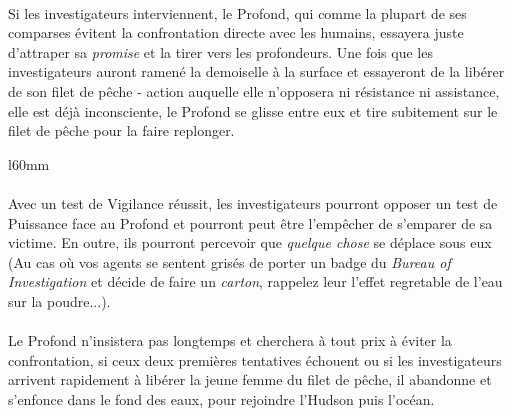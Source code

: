 \paragraph{} Si les investigateurs interviennent, le Profond, qui comme la plupart de ses comparses évitent la confrontation directe avec les humains,
essayera juste d'attraper sa \emph{promise} et la tirer vers les profondeurs. Une fois que les investigateurs auront ramené la demoiselle à la surface
et essayeront de la libérer de son filet de pêche - action auquelle elle n'opposera ni résistance ni assistance, elle est déjà inconsciente, le Profond
se glisse entre eux et tire subitement sur le filet de pêche pour la faire replonger.

\begin{wrapfigure}{l}{60mm}
\end{wrapfigure}

\paragraph{} Avec un test de Vigilance réussit, les investigateurs pourront opposer un test de Puissance face au Profond et pourront peut être l'empêcher
de s'emparer de sa victime. En outre, ils pourront percevoir que \textit{quelque chose} se déplace sous eux (Au cas où vos agents se sentent
grisés de porter un badge du \textit{Bureau of Investigation} et décide de faire un \textit{carton}, rappelez leur l'effet regretable de l'eau
sur la poudre...).

\paragraph{} Le Profond n'insistera pas longtemps et cherchera à tout prix à éviter la confrontation, si ceux deux premières tentatives échouent ou
si les investigateurs arrivent rapidement à libérer la jeune femme du filet de pêche, il abandonne et s'enfonce dans le fond des eaux, pour rejoindre
l'Hudson puis l'océan.
